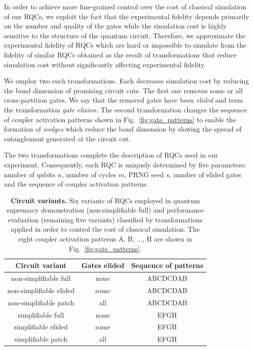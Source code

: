 In order to achieve more fine-grained control over the cost of classical simulation of our RQCs, we exploit the fact that the experimental fidelity depends primarily on the number and quality of the gates while the simulation cost is highly sensitive to the structure of the quantum circuit. Therefore, we approximate the experimental fidelity of RQCs which are hard or impossible to simulate from the fidelity of similar RQCs obtained as the result of transformations that reduce simulation cost without significantly affecting experimental fidelity.

We employ two such transformations. Each decreases simulation cost by reducing the bond dimension of promising circuit cuts. The first one removes some or all cross-partition gates. We say that the removed gates have been \textit{elided} and term the transformation \textit{gate elision}. The second transformation changes the sequence of coupler activation patterns shown in Fig.~\ref{fig:gate_patterns} to enable the formation of \textit{wedges} which reduce the bond dimension by slowing the spread of entanglement generated at the circuit cut.

The two transformations complete the description of RQCs used in our experiment. Consequently, each RQC is uniquely determined by five parameters: number of qubits $n$, number of cycles $m$, PRNG seed $s$, number of elided gates and the sequence of coupler activation patterns.

\begin{table}
\centering
\begin{tabular}{|c|c|c|}
\hline
\textbf{Circuit variant} & \textbf{Gates elided} & \textbf{Sequence of patterns} \tabularnewline
\hline
\hline
non-simplifiable full & none & ABCDCDAB \tabularnewline
non-simplifiable elided & some & ABCDCDAB \tabularnewline
non-simplifiable patch & all & ABCDCDAB \tabularnewline
simplifiable full      & none & EFGH \tabularnewline
simplifiable elided    & some & EFGH \tabularnewline
simplifiable patch     & all  & EFGH \tabularnewline
\hline
\end{tabular}
\caption{\label{table:rqc_variants} \textbf{Circuit variants.} Six variants of RQCs employed in quantum supremacy demonstration (non-simplifiable full) and performance evaluation (remaining five variants) classified by transformations applied in order to control the cost of classical simulation. The eight coupler activation patterns A, B, ..., H are shown in Fig.~\ref{fig:gate_patterns}.}
\end{table}
 
